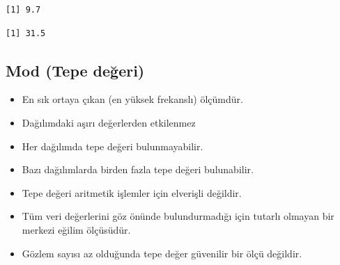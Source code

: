 \documentclass[
  letterpaper,
  DIV=11,
  numbers=noendperiod]{scrreprt}
\newenvironment{Shaded}{\begin{snugshade}}{\end{snugshade}}
\newcommand{\AttributeTok}[1]{\textcolor[rgb]{0.40,0.45,0.13}{#1}}
\newcommand{\ConstantTok}[1]{\textcolor[rgb]{0.56,0.35,0.01}{#1}}
\newcommand{\FunctionTok}[1]{\textcolor[rgb]{0.28,0.35,0.67}{#1}}
\newcommand{\NormalTok}[1]{\textcolor[rgb]{0.00,0.23,0.31}{#1}}
\newcommand{\SpecialCharTok}[1]{\textcolor[rgb]{0.37,0.37,0.37}{#1}}
\begin{document}
\begin{Shaded}
\end{Shaded}

\begin{verbatim}
[1] 9.7
\end{verbatim}

\begin{Shaded}
\end{Shaded}

\begin{verbatim}
[1] 31.5
\end{verbatim}

\hypertarget{mod-tepe-deux11feri}{%
\subsection*{Mod (Tepe değeri)}\label{mod-tepe-deux11feri}}

\begin{itemize}
\item
  En sık ortaya çıkan (en yüksek frekanslı) ölçümdür.
\item
  Dağılımdaki aşırı değerlerden etkilenmez
\item
  Her dağılımda tepe değeri bulunmayabilir.
\item
  Bazı dağılımlarda birden fazla tepe değeri bulunabilir.
\item
  Tepe değeri aritmetik işlemler için elverişli değildir.
\item
  Tüm veri değerlerini göz önünde bulundurmadığı için tutarlı olmayan
  bir merkezi eğilim ölçüsüdür.
\item
  Gözlem sayısı az olduğunda tepe değer güvenilir bir ölçü değildir.
\end{itemize}
\end{document}

